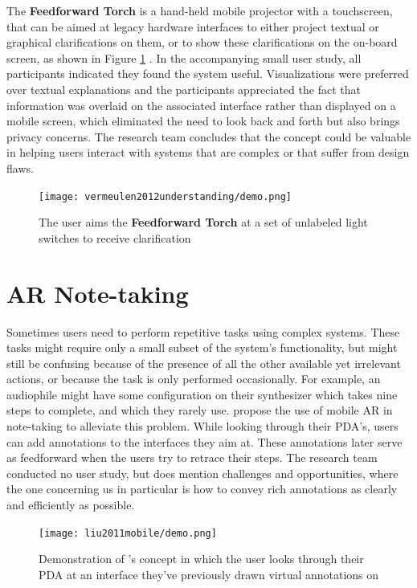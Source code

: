 The \textbf{Feedforward Torch} is a hand-held mobile projector with a touchscreen, that can be aimed at legacy hardware interfaces to either project textual or graphical clarifications on them, or to show these clarifications on the on-board screen, as shown in Figure \ref{fig:vermeulen2012understanding_demo} \cite{vermeulen2012understanding}. In the accompanying small user study, all participants indicated they found the system useful. Visualizations were preferred over textual explanations and the participants appreciated the fact that information was overlaid on the associated interface rather than displayed on a mobile screen, which eliminated the need to look back and forth but also brings privacy concerns. The research team concludes that the concept could be valuable in helping users interact with systems that are complex or that suffer from design flaws.

\begin{figure}
    \centering
    \texttt{[image: vermeulen2012understanding/demo.png]}
    \caption{The user aims the \textbf{Feedforward Torch} at a set of unlabeled light switches to receive clarification \cite{vermeulen2012understanding}}
    \label{fig:vermeulen2012understanding_demo}
\end{figure}

\section{AR Note-taking} \label{sec:relat:ar_note-taking}
Sometimes users need to perform repetitive tasks using complex systems. These tasks might require only a small subset of the system's functionality, but might still be confusing because of the presence of all the other available yet irrelevant actions, or because the task is only performed occasionally. For example, an audiophile might have some configuration on their synthesizer which takes nine steps to complete, and which they rarely use. \textbf{\citeauthor{liu2011mobile}} propose the use of mobile AR in note-taking \cite{liu2011mobile} to alleviate this problem. While looking through their PDA's, users can add annotations to the interfaces they aim at. These annotations later serve as feedforward when the users try to retrace their steps. The research team conducted no user study, but does mention challenges and opportunities, where the one concerning us in particular is how to convey rich annotations as clearly and efficiently as possible.

\begin{figure}
    \centering
    \texttt{[image: liu2011mobile/demo.png]}
    \caption{Demonstration of \textbf{\citeauthor{liu2011mobile}}'s concept in which the user looks through their PDA at an interface they've previously drawn virtual annotations on \cite{liu2011mobile}}
    \label{fig:liu2011mobile_demo}
\end{figure}

